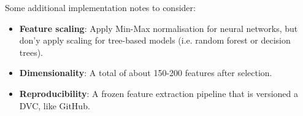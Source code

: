 \noindent Some additional implementation notes to consider: 

\begin{itemize}
  \item \textbf{Feature scaling}: Apply Min-Max normalisation for neural networks, but don'y apply scaling for tree-based models (i.e. random forest or decision trees).
  \item \textbf{Dimensionality}: A total of about 150-200 features after selection.
  \item \textbf{Reproducibility}: A frozen feature extraction pipeline that is versioned a DVC, like GitHub.
\end{itemize}
